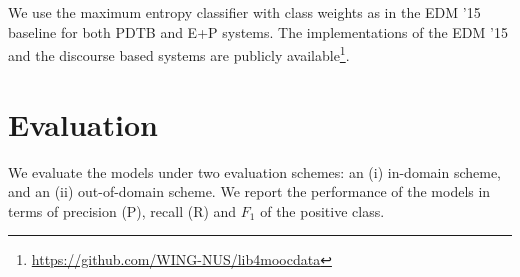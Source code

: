 \documentclass[letterpaper]{article}
\begin{document}
\noindent We use the maximum entropy classifier with class weights 
as in the EDM '15 baseline for both PDTB and E+P systems. The implementations 
of the EDM '15 and the discourse based systems are 
publicly available\footnote{\url{https://github.com/WING-NUS/lib4moocdata}}.



\section{Evaluation}
\label{sect:result}
We evaluate the models under two evaluation schemes: an 
(i) in-domain scheme, and 
an (ii) out-of-domain scheme. We report the performance 
of the models in terms of precision (P), recall (R) and 
$F_1$ of the positive class.
\end{document}

